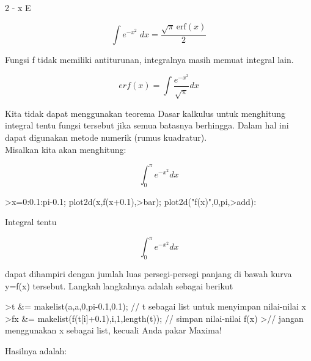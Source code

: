 \documentclass{article}
\begin{document}
\begin{eulernotebook}
\begin{eulercomment}
\begin{eulercomment}
\begin{eulercomment}
\begin{eulercomment}
\begin{eulercomment}
\begin{eulercomment}
\begin{eulercomment}
\begin{eulercomment}
\begin{eulercomment}
\begin{eulercomment}
\begin{euleroutput}
                                      2
                                   - x
                                  E
  
\end{euleroutput}
\begin{eulerformula}
\[
\int {e^ {- x^2 }}{\;dx}=\frac{\sqrt{\pi}\,\mathrm{erf}\left(x
 \right)}{2}
\]
\end{eulerformula}
\begin{eulercomment}
Fungsi f tidak memiliki antiturunan, integralnya masih memuat integral
lain.

\end{eulercomment}
\begin{eulerformula}
\[
erf(x)=\int \frac{e^{-x^2}}{\sqrt{\pi}}dx
\]
\end{eulerformula}
\begin{eulercomment}
Kita tidak dapat menggunakan teorema Dasar kalkulus untuk menghitung
integral tentu fungsi tersebut jika semua batasnya berhingga. Dalam
hal ini dapat digunakan metode numerik (rumus kuadratur).\\
Misalkan kita akan menghitung:

\end{eulercomment}
\begin{eulerformula}
\[
\int_{0}^{\pi}e^{-x^2}dx
\]
\end{eulerformula}
\begin{eulerprompt}
>x=0:0.1:pi-0.1; plot2d(x,f(x+0.1),>bar); plot2d("f(x)",0,pi,>add):
\end{eulerprompt}
\begin{eulercomment}
Integral tentu

\end{eulercomment}
\begin{eulerformula}
\[
\int_{0}^{\pi}e^{-x^2}dx
\]
\end{eulerformula}
\begin{eulercomment}
dapat dihampiri dengan jumlah luas persegi-persegi panjang di bawah
kurva y=f(x) tersebut. Langkahlangkahnya adalah sebagai berikut
\end{eulercomment}
\begin{eulerprompt}
>t &= makelist(a,a,0,pi-0.1,0.1); // t sebagai list untuk menyimpan nilai-nilai x
>fx &= makelist(f(t[i]+0.1),i,1,length(t)); // simpan nilai-nilai f(x)
>// jangan menggunakan x sebagai list, kecuali Anda pakar Maxima!
\end{eulerprompt}
\begin{eulercomment}
Hasilnya adalah:


\end{eulercomment}
\end{eulercomment}
\end{eulercomment}
\end{eulercomment}
\end{eulercomment}
\end{eulercomment}
\end{eulercomment}
\end{eulercomment}
\end{eulercomment}
\end{eulercomment}
\end{eulercomment}
\end{eulernotebook}
\end{document}

